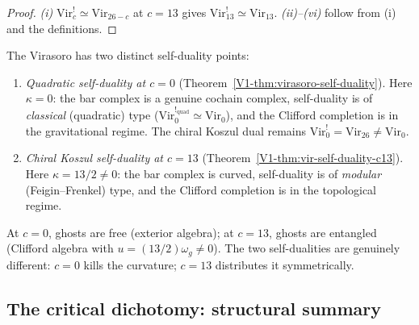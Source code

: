 \begin{proof}
\emph{(i)} $\mathrm{Vir}_c^! \simeq \mathrm{Vir}_{26-c}$ at $c = 13$
gives $\mathrm{Vir}_{13}^! \simeq \mathrm{Vir}_{13}$.
\emph{(ii)--(vi)} follow from (i) and the definitions.
\end{proof}

\begin{remark}
The Virasoro has two distinct self-duality points:
\begin{enumerate}[label=\textup{(\alph*)}]
\item \emph{Quadratic self-duality at $c = 0$}
(Theorem~\ref{V1-thm:virasoro-self-duality}). Here $\kappa = 0$: the bar
complex is a genuine cochain complex, self-duality is of \emph{classical}
(quadratic) type ($\mathrm{Vir}_0^{!_{\mathrm{quad}}} \simeq \mathrm{Vir}_0$),
and the Clifford completion is in the gravitational
regime. The chiral Koszul dual remains
$\mathrm{Vir}_0^! = \mathrm{Vir}_{26} \neq \mathrm{Vir}_0$.

\item \emph{Chiral Koszul self-duality at $c = 13$}
(Theorem~\ref{V1-thm:vir-self-duality-c13}). Here $\kappa = 13/2 \neq 0$:
the bar complex is curved, self-duality is of \emph{modular}
(Feigin--Frenkel) type, and the Clifford completion is in the topological
regime.
\end{enumerate}
At $c = 0$, ghosts are free (exterior algebra); at $c = 13$, ghosts
are entangled (Clifford algebra with $u = (13/2)\omega_g \neq 0$).
The two self-dualities are genuinely different: $c = 0$ kills the
curvature; $c = 13$ distributes it symmetrically.
\end{remark}

%
%

\subsection{The critical dichotomy: structural summary}

